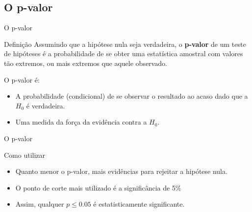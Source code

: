 \documentclass{beamer}
\begin{document}
\subsection{O p-valor}

\begin{frame}{O p-valor}
  \begin{block}{Definição}
    Assumindo que a hipótese nula seja verdadeira, o {\bf p-valor} de
    um teste de hipóteses é a probabilidade de se obter uma
    estatística amostral com valores \alert{tão extremos, ou mais
      extremos} que aquele observado.
  \end{block}

  O p-valor \alert{é}:
  \begin{itemize}
    \footnotesize
  \item A probabilidade (condicional) de se observar o resultado ao
    acaso \alert{dado que} a $H_0$ é verdadeira.
  \item Uma medida da força da evidência \alert{contra} a $H_0$.
  \end{itemize}
\end{frame}

\begin{frame}{O p-valor}
  \begin{block}{Como utilizar}
    \begin{itemize}
    \item Quanto menor o p-valor, mais evidências para rejeitar a
      hipótese nula.
    \item O ponto de corte mais utilizado é a significância de 5\%
    \item Assim, qualquer $p \le 0.05$ é estatisticamente significante.
    \end{itemize}
  \end{block}
\end{frame}


\end{document}
